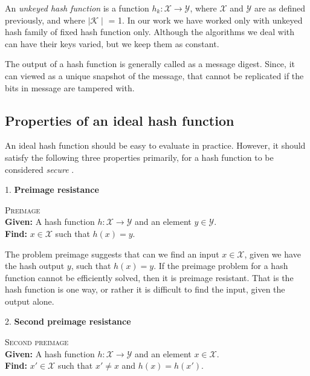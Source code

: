 An \emph{unkeyed hash function} is a function $h_{k}: \mathcal{X} \to \mathcal{Y}$, where $\mathcal{X}$ and
$\mathcal{Y}$ are as defined previously, and where $\mid\mathcal{K}\mid$ = 1. 
In our work we have worked only with unkeyed hash family of fixed hash function only. Although the algorithms
we deal with can have their keys varied, but we keep them as constant.

The output of a hash function is generally called as a message digest. Since, it can viewed as a unique
snapshot of the message, that cannot be replicated if the bits in message are tampered with.
  
\subsection{Properties of an ideal hash function}
An ideal hash function should be easy to evaluate in practice. However, it should satisfy the following
three properties primarily, for a hash function to be considered \emph{secure} \cite{00005}.

1. {\bf Preimage resistance}
\begin{center}
  \framebox
  {
    \parbox{300pt}
    {
      \centering \textsc{Preimage} \\
      {\bf Given:} A hash function $h : \mathcal{X} \to \mathcal{Y}$ and an element $y \in \mathcal{Y}$. \\
      {\bf Find:} $x \in \mathcal{X}$ such that $h(x) = y$. 
    }
  }
\end{center}
\vspace{4mm}

The problem preimage suggests that can we find an input $x \in \mathcal{X}$, given we have the hash 
output $y$, such that $h(x) = y$. If the preimage problem for a hash function cannot be efficiently
solved, then it is preimage resistant. That is the hash function is one way, or rather it is difficult
to find the input, given the output alone.

2. {\bf Second preimage resistance}
\begin{center}
  \framebox
  {
    \parbox{300pt}
    {
      \centering \textsc{Second preimage} \\
      {\bf Given:} A hash function $h : \mathcal{X} \to \mathcal{Y}$ and an element $x \in \mathcal{X}$. \\
      {\bf Find:} $x' \in \mathcal{X}$ such that $x' \neq x$ and $h(x) = h(x')$. 
    }
  }
\end{center}
\vspace{4mm}

